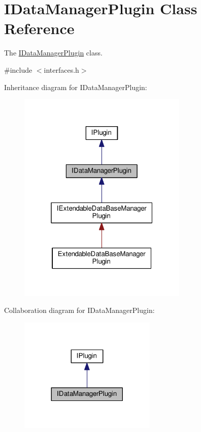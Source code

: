 \hypertarget{class_i_data_manager_plugin}{}\section{I\+Data\+Manager\+Plugin Class Reference}
\label{class_i_data_manager_plugin}


The \hyperlink{class_i_data_manager_plugin}{I\+Data\+Manager\+Plugin} class.  




{\ttfamily \#include $<$interfaces.\+h$>$}



Inheritance diagram for I\+Data\+Manager\+Plugin\+:\nopagebreak
\begin{figure}[H]
\begin{center}
\leavevmode
\includegraphics[width=229pt]{class_i_data_manager_plugin__inherit__graph}
\end{center}
\end{figure}


Collaboration diagram for I\+Data\+Manager\+Plugin\+:\nopagebreak
\begin{figure}[H]
\begin{center}
\leavevmode
\includegraphics[width=185pt]{class_i_data_manager_plugin__coll__graph}
\end{center}
\end{figure}
